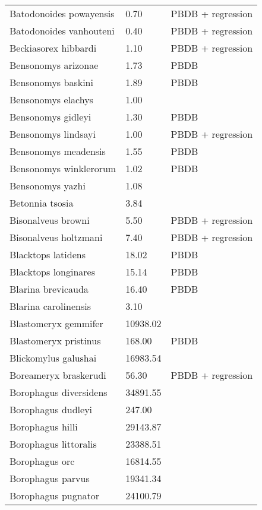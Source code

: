 \documentclass{article}
\begin{document}
\begin{center}
\begin{longtable}{p{} p{} p{}}
    Batodonoides powayensis & 0.70 & PBDB + regression \\ 
    Batodonoides vanhouteni & 0.40 & PBDB + regression \\ 
    Beckiasorex hibbardi & 1.10 & PBDB + regression \\ 
    Bensonomys arizonae & 1.73 & PBDB \\ 
    Bensonomys baskini & 1.89 & PBDB \\ 
    Bensonomys elachys & 1.00 & \cite{Kirk2011} \\ 
    Bensonomys gidleyi & 1.30 & PBDB \\ 
    Bensonomys lindsayi & 1.00 & PBDB + regression \\ 
    Bensonomys meadensis & 1.55 & PBDB \\ 
    Bensonomys winklerorum & 1.02 & PBDB \\ 
    Bensonomys yazhi & 1.08 & \cite{Rose2013a} \\ 
    Betonnia tsosia & 3.84 & \cite{Clemens2005} \\ 
    Bisonalveus browni & 5.50 & PBDB + regression \\ 
    Bisonalveus holtzmani & 7.40 & PBDB + regression \\ 
    Blacktops latidens & 18.02 & PBDB \\ 
    Blacktops longinares & 15.14 & PBDB \\ 
    Blarina brevicauda & 16.40 & PBDB \\ 
    Blarina carolinensis & 3.10 & \cite{Smith2004} \\ 
    Blastomeryx gemmifer & 10938.02 & \cite{Tomiya2013} \\ 
    Blastomeryx pristinus & 168.00 & PBDB \\ 
    Blickomylus galushai & 16983.54 & \cite{Tomiya2013} \\ 
    Boreameryx braskerudi & 56.30 & PBDB + regression \\ 
    Borophagus diversidens & 34891.55 & \cite{Tomiya2013} \\ 
    Borophagus dudleyi & 247.00 & \cite{Dalquest1978} \\ 
    Borophagus hilli & 29143.87 & \cite{Tomiya2013} \\ 
    Borophagus littoralis & 23388.51 & \cite{Tomiya2013} \\ 
    Borophagus orc & 16814.55 & \cite{Tomiya2013} \\ 
    Borophagus parvus & 19341.34 & \cite{Tomiya2013} \\ 
    Borophagus pugnator & 24100.79 & \cite{Tomiya2013} \\ 

\end{longtable}
\end{center}
\end{document}
